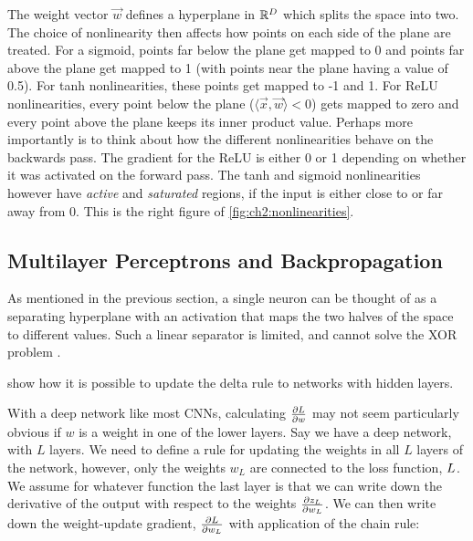 The weight vector $\vec{w}$ defines a hyperplane in $\reals[D]$ which splits the
space into two. The choice of nonlinearity then affects how points on each side
of the plane are treated. For a sigmoid, points far below the plane get mapped
to 0 and points far above the plane get mapped to 1 (with points near the plane
having a value of 0.5). For tanh nonlinearities, these points get mapped to -1
and 1. For ReLU nonlinearities, every point below the plane ($\langle\vec{x},
\vec{w}\rangle < 0$) gets mapped to zero and every point above the plane keeps
its inner product value. Perhaps more importantly is to think about how the
different nonlinearities behave on the backwards pass. The gradient for the ReLU
is either 0 or 1 depending on whether it was activated on the forward pass. The
tanh and sigmoid nonlinearities however have \emph{active} and \emph{saturated}
regions, if the input is either close to or far away from 0. This is the right
figure of \autoref{fig:ch2:nonlinearities}.

\begin{figure}
    \qquad
    
    \quad
    
  \centering
  \label{fig:ch2:nonlinearities}
\end{figure}

\subsection{Multilayer Perceptrons and Backpropagation}
As mentioned in the previous section, a single neuron can be thought of as a
separating hyperplane with an activation that maps the two halves of the space
to different values. Such a linear separator is limited, and cannot solve the
XOR problem \cite{minsky_perceptrons:_1988}.

\citep{rumelhart_parallel_1986} show how it is possible to update the delta
rule to networks with hidden layers.

With a deep network like most CNNs, calculating $\dydx{L}{w}$ may not seem
particularly obvious if $w$ is a weight in one of the lower layers.  Say we have
a deep network, with $L$ layers. We need to define a rule for updating the
weights in all $L$ layers of the network, however, only the weights $w_L$ are
connected to the loss function, $\loss$. We assume for whatever function the
last layer is that we can write down the derivative of the output with respect
to the weights $\dydx{z_{L}}{w_{L}}$. We can then write down the weight-update
gradient, $\dydx{\loss}{w_L}$ with application of the chain rule:

